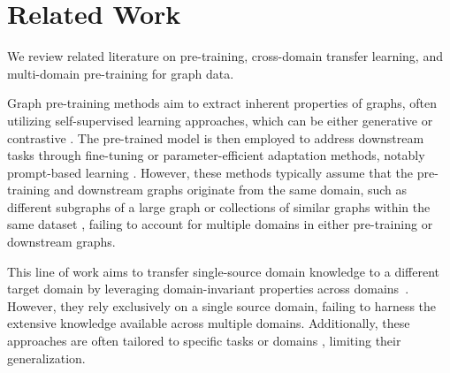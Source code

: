 \section{Related Work}

We review related literature on pre-training, cross-domain transfer learning, and multi-domain pre-training for graph data.

Graph pre-training methods aim to extract inherent properties of graphs, often utilizing self-supervised learning approaches, which can be either generative \cite{hu2020gpt,li2023s,hou2022graphmae,jiang2023incomplete} or contrastive \cite{velivckovic2018deep,xia2022simgrace,xu2021self,li2022mining}. The pre-trained model is then employed to address downstream tasks through fine-tuning \cite{you2020graph,velivckovic2018deep,qiu2020gcc} or parameter-efficient adaptation methods, notably prompt-based learning \cite{sun2022gppt,liu2023graphprompt,yu2023generalized,fang2022universal}. However, these methods typically assume that the pre-training and downstream graphs originate from the same domain, such as different subgraphs of a large graph \cite{you2020graph,yu2023hgprompt} or collections of similar graphs within the same dataset \cite{hu2020gpt,qiu2020gcc}, failing to account for multiple domains in either pre-training or downstream graphs.

This line of work aims to transfer single-source domain knowledge to a different target domain by leveraging domain-invariant properties across domains~\cite{ding2021cross,hassani2022cross,wang2021pre,wang2023cross}. However, they rely exclusively on a single source domain, failing to harness the extensive knowledge available across multiple domains. Additionally, these approaches are often tailored to specific tasks or domains \cite{ding2021cross,hassani2022cross,wang2021pre,wang2023cross}, limiting their generalization.

